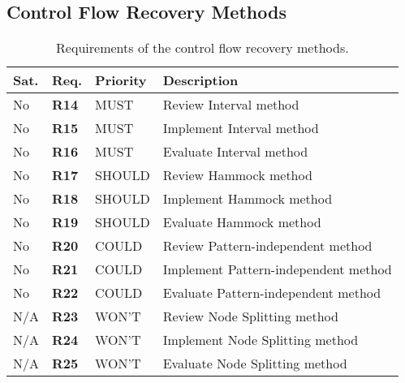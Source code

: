 
\subsection{Control Flow Recovery Methods}


\begin{table}[htbp]
	\begin{center}
		\begin{tabular}{|l|l|l|l|}
			\hline
			Sat. & Req. & Priority & Description \\
			\hline
			\rowcolor{light_red_3}
			No & \textbf{R14} & MUST & Review Interval method \\
			\rowcolor{light_green_3}
			No & \textbf{R15} & MUST & Implement Interval method \\
			\rowcolor{light_red_3}
			No & \textbf{R16} & MUST & Evaluate Interval method \\
			\hline
			\rowcolor{light_green_3}
			No & \textbf{R17} & SHOULD & Review Hammock method \\
			\rowcolor{light_green_3}
			No & \textbf{R18} & SHOULD & Implement Hammock method \\
			\rowcolor{light_red_3}
			No & \textbf{R19} & SHOULD & Evaluate Hammock method \\
			\hline
			\rowcolor{light_red_3}
			No & \textbf{R20} & COULD & Review Pattern-independent method \\
			\rowcolor{light_red_3}
			No & \textbf{R21} & COULD & Implement Pattern-independent method \\
			\rowcolor{light_red_3}
			No & \textbf{R22} & COULD & Evaluate Pattern-independent method \\
			\hline
			N/A & \textbf{R23} & WON'T & Review Node Splitting method \\
			N/A & \textbf{R24} & WON'T & Implement Node Splitting method \\
			N/A & \textbf{R25} & WON'T & Evaluate Node Splitting method \\
			\hline
		\end{tabular}
	\end{center}
	\caption{Requirements of the control flow recovery methods.}
	\label{tbl:eval_summary_of_control_flow_recovery_methods}
\end{table}

